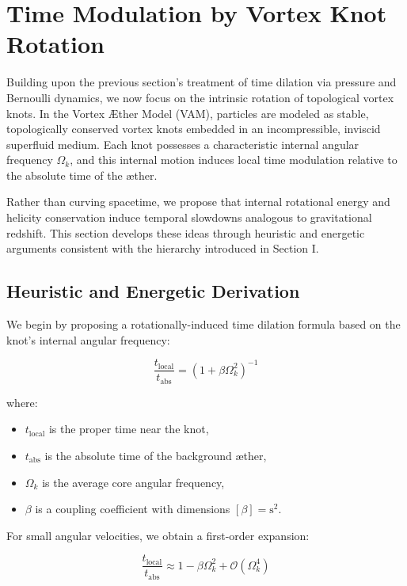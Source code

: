 \section{Time Modulation by Vortex Knot Rotation}

Building upon the previous section's treatment of time dilation via pressure and Bernoulli dynamics, we now focus on the intrinsic rotation of topological vortex knots. In the Vortex Æther Model (VAM), particles are modeled as stable, topologically conserved vortex knots embedded in an incompressible, inviscid superfluid medium. Each knot possesses a characteristic internal angular frequency $\Omega_k$, and this internal motion induces local time modulation relative to the absolute time of the æther.

Rather than curving spacetime, we propose that internal rotational energy and helicity conservation induce temporal slowdowns analogous to gravitational redshift. This section develops these ideas through heuristic and energetic arguments consistent with the hierarchy introduced in Section I.

\subsection{Heuristic and Energetic Derivation}

We begin by proposing a rotationally-induced time dilation formula based on the knot's internal angular frequency:

\begin{equation}
\frac{t_{\text{local}}}{t_{\text{abs}}} = \left(1 + \beta \Omega_k^2 \right)^{-1}\label{eq:rotational_induced_time_dilation}
\end{equation}

where:

\begin{itemize}
\item $t_{\text{local}}$ is the proper time near the knot,
\item $t_{\text{abs}}$ is the absolute time of the background æther,
\item $\Omega_k$ is the average core angular frequency,
\item $\beta$ is a coupling coefficient with dimensions $[\beta] = \text{s}^2$.
\end{itemize}

For small angular velocities, we obtain a first-order expansion:

\begin{equation}
\frac{t_{\text{local}}}{t_{\text{abs}}} \approx 1 - \beta \Omega_k^2 + \mathcal{O}(\Omega_k^4)\label{eq:rotational_induced_time_dilation_expansion}
\end{equation}

